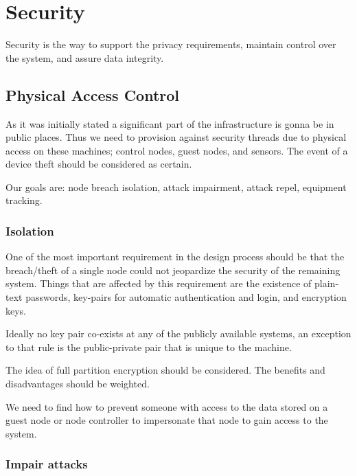 \section{Security}

Security is the way to support the privacy requirements, maintain control over the system, and assure data integrity.

\subsection{Physical Access Control}

As it was initially stated a significant part of the infrastructure is gonna be in public places. Thus we need to provision against security threads due to physical access on these machines; control nodes, guest nodes, and sensors. The event of a device theft should be considered as certain.

Our goals are: node breach isolation, attack impairment, attack repel, equipment tracking.

\subsubsection{Isolation}

One of the most important requirement in the design process should be that the breach/theft of a single node could not jeopardize the security of the remaining system. Things that are affected by this requirement are the existence of plain-text passwords, key-pairs for automatic authentication and login, and encryption keys.

Ideally no key pair co-exists at any of the publicly available systems, an exception to that rule is the public-private pair that is unique to the machine.

The idea of full partition encryption should be considered. The benefits and disadvantages should be weighted. 

We need to find how to prevent someone with access to the data stored on a guest node or node controller to impersonate that node to gain access to the system.

\subsubsection{Impair attacks}

